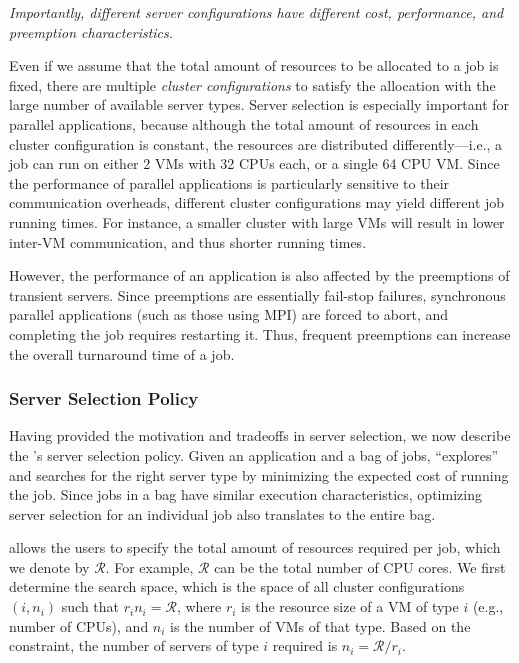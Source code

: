 \noindent \emph{Importantly, different server configurations have different cost, performance, and preemption characteristics. }


Even if we assume that the total amount of resources to be allocated to a job is fixed, there are multiple \emph{cluster configurations} to satisfy the allocation with the large number of available server types. 
Server selection is especially important for parallel applications, because although the total amount of resources in each cluster configuration is constant, the resources are distributed differently---i.e., a job can run on either 2 VMs with 32 CPUs each, or a single 64 CPU VM.  
Since the performance of parallel applications is particularly sensitive to their communication overheads, different cluster configurations may yield different job running times.
For instance, a smaller cluster with large VMs will result in lower inter-VM communication, and thus shorter running times. 

However, the performance of an application is also affected by the preemptions of transient servers.
Since preemptions are essentially fail-stop failures, synchronous parallel applications (such as those using MPI) are forced to  abort, and completing the job requires restarting it. 
Thus, frequent preemptions can increase the overall turnaround time of a job. 

\vspace*{\subsecspace}
\subsubsection{Server Selection Policy}

Having provided the motivation and tradeoffs in server selection, we now describe the \sysname's server selection policy. 
Given an application and a bag of jobs, \sysname ``explores'' and searches for the right server type by minimizing the expected cost of running the job.
Since jobs in a bag have similar execution characteristics, optimizing server selection for an individual job also translates to the entire bag. 


\sysname allows the users to specify the total amount of resources required per job, which we denote by $\mathcal{R}$.
For example, $\mathcal{R}$ can be the total number of CPU cores. 
We first determine the search space, which is the space of all cluster configurations $(i,n_i)$ such that $r_i n_i = \mathcal{R}$, where $r_i$ is the resource size of a VM of type $i$ (e.g., number of CPUs), and $n_i$ is the number of VMs of that type. 
Based on the constraint, the number of servers of type $i$ required is $n_i = \mathcal{R}/r_i$.

